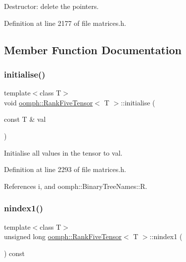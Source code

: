 Destructor\+: delete the pointers. 



Definition at line 2177 of file matrices.\+h.



\subsection{Member Function Documentation}
\mbox{\label{classoomph_1_1RankFiveTensor_ad3fbc9fc71b68eec0fa4c00d9ad663b6}} 
\subsubsection{\texorpdfstring{initialise()}{initialise()}}
{\footnotesize\ttfamily template$<$class T$>$ \\
void \hyperlink{classoomph_1_1RankFiveTensor}{oomph\+::\+Rank\+Five\+Tensor}$<$ T $>$\+::initialise (\begin{DoxyParamCaption}\item[{const T \&}]{val }\end{DoxyParamCaption})\hspace{0.3cm}{\ttfamily [inline]}}



Initialise all values in the tensor to val. 



Definition at line 2293 of file matrices.\+h.



References i, and oomph\+::\+Binary\+Tree\+Names\+::R.

\mbox{\label{classoomph_1_1RankFiveTensor_ad9f5651447193b2c7e669beff9146cc9}} 
\subsubsection{\texorpdfstring{nindex1()}{nindex1()}}
{\footnotesize\ttfamily template$<$class T$>$ \\
unsigned long \hyperlink{classoomph_1_1RankFiveTensor}{oomph\+::\+Rank\+Five\+Tensor}$<$ T $>$\+::nindex1 (\begin{DoxyParamCaption}{ }\end{DoxyParamCaption}) const\hspace{0.3cm}{\ttfamily [inline]}}



